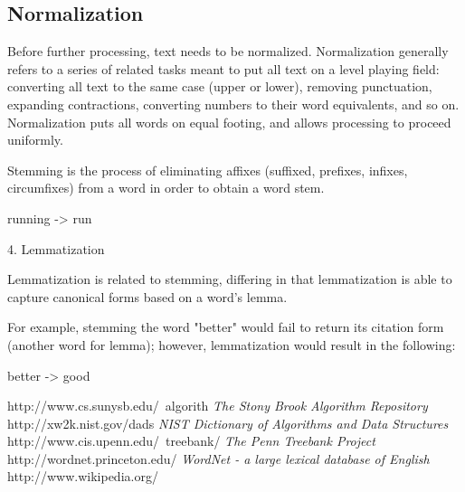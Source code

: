 \subsection{Normalization}

Before further processing, text needs to be normalized. Normalization generally refers to a series of related tasks meant to put all text on a level playing field: converting all text to the same case (upper or lower), removing punctuation, expanding contractions, converting numbers to their word equivalents, and so on. Normalization puts all words on equal footing, and allows processing to proceed uniformly.


Stemming is the process of eliminating affixes (suffixed, prefixes, infixes, circumfixes) from a word in order to obtain a word stem.

running -> run

4. Lemmatization

Lemmatization is related to stemming, differing in that lemmatization is able to capture canonical forms based on a word's lemma.

For example, stemming the word "better" would fail to return its citation form (another word for lemma); however, lemmatization would result in the following:

better -> good




\footnotesize
\begin{thebibliography}{99}

 http://www.cs.sunysb.edu/~algorith {\em The Stony Brook Algorithm Repository}
 http://xw2k.nist.gov/dads {\em NIST Dictionary of Algorithms and Data Structures}
 http://www.cis.upenn.edu/~treebank/ {\em The Penn Treebank Project}
 http://wordnet.princeton.edu/ {\em WordNet - a large lexical database of English}
 http://www.wikipedia.org/
\end{thebibliography}
